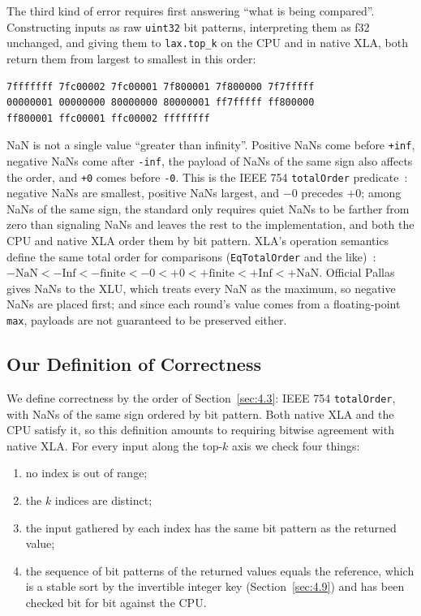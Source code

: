 \documentclass[sigconf,nonacm,balance=false]{acmart}
\newcommand{\code}[1]{\texttt{#1}}
\begin{document}
The third kind of error requires first answering ``what is being compared''. Constructing inputs as raw \code{uint32} bit patterns, interpreting them as f32 unchanged, and giving them to \code{lax.\allowbreak{}top\_\allowbreak{}k} on the CPU and in native XLA, both return them from largest to smallest in this order:

\begin{lstlisting}
7fffffff 7fc00002 7fc00001 7f800001 7f800000 7f7fffff
00000001 00000000 80000000 80000001 ff7fffff ff800000
ff800001 ffc00001 ffc00002 ffffffff
\end{lstlisting}
NaN is not a single value ``greater than infinity''. Positive NaNs come before \code{+inf}, negative NaNs come after \code{-inf}, the payload of NaNs of the same sign also affects the order, and \code{+0} comes before \code{-0}. This is the IEEE 754 \code{total\allowbreak{}Order} predicate~\cite{ieee754}: negative NaNs are smallest, positive NaNs largest, and $-0$ precedes $+0$; among NaNs of the same sign, the standard only requires quiet NaNs to be farther from zero than signaling NaNs and leaves the rest to the implementation, and both the CPU and native XLA order them by bit pattern. XLA's operation semantics define the same total order for comparisons (\code{Eq\allowbreak{}Total\allowbreak{}Order} and the like)~\cite{xla-compare}: $-\mathrm{NaN} < -\mathrm{Inf} < -\mathrm{finite} < -0 < +0 < +\mathrm{finite} < +\mathrm{Inf} < +\mathrm{NaN}$. Official Pallas gives NaNs to the XLU, which treats every NaN as the maximum, so negative NaNs are placed first; and since each round's value comes from a floating-point \code{max}, payloads are not guaranteed to be preserved either.

\subsection{Our Definition of Correctness}
\label{sec:4.4}

We define correctness by the order of Section~\ref{sec:4.3}: IEEE 754 \code{total\allowbreak{}Order}, with NaNs of the same sign ordered by bit pattern. Both native XLA and the CPU satisfy it, so this definition amounts to requiring bitwise agreement with native XLA. For every input along the top-$k$ axis we check four things:

\begin{enumerate}
\item no index is out of range;
\item the $k$ indices are distinct;
\item the input gathered by each index has the same bit pattern as the returned value;
\item the sequence of bit patterns of the returned values equals the reference, which is a stable sort by the invertible integer key (Section~\ref{sec:4.9}) and has been checked bit for bit against the CPU.
\end{enumerate}
\end{document}
